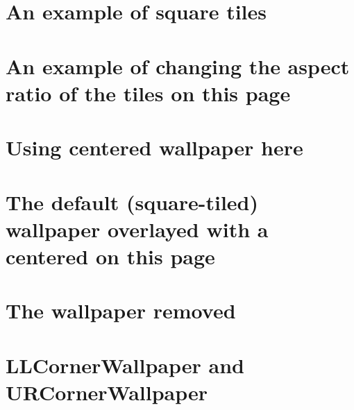 \documentclass[a4paper,11pt]{article}
\begin{document}
\section*{An example of square tiles}
\newpage
{}
\section*{An example of changing the aspect ratio of the tiles on this page}
\newpage
{}
\color{white}
\section*{Using centered wallpaper here}
\newpage
{}
\color{black}
\section*{The default (square-tiled) wallpaper overlayed with a centered on this page}
\newpage
\ClearWallPaper
\section*{The wallpaper removed}
\newpage
{}
\section*{LLCornerWallpaper and URCornerWallpaper }
\end{document}
